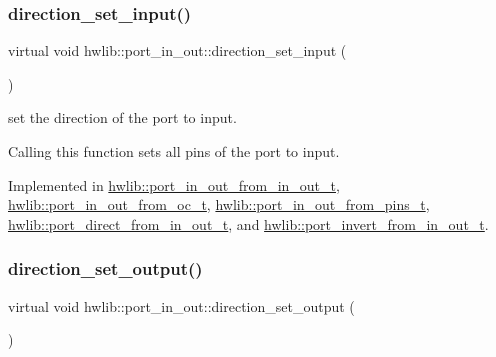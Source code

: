 \subsubsection{\texorpdfstring{direction\+\_\+set\+\_\+input()}{direction\_set\_input()}}
{\footnotesize\ttfamily virtual void hwlib\+::port\+\_\+in\+\_\+out\+::direction\+\_\+set\+\_\+input (\begin{DoxyParamCaption}{ }\end{DoxyParamCaption})\hspace{0.3cm}{\ttfamily [pure virtual]}}

set the direction of the port to input.

Calling this function sets all pins of the port to input. 

Implemented in \hyperlink{classhwlib_1_1port__in__out__from__in__out__t_a49e31b927bbf0c677cc9e436459aae44}{hwlib\+::port\+\_\+in\+\_\+out\+\_\+from\+\_\+in\+\_\+out\+\_\+t}, \hyperlink{classhwlib_1_1port__in__out__from__oc__t_a701fe36cf6d03151ede1382c0ee054c5}{hwlib\+::port\+\_\+in\+\_\+out\+\_\+from\+\_\+oc\+\_\+t}, \hyperlink{classhwlib_1_1port__in__out__from__pins__t_acdd41d7b0788c259ef2a7a62ea9476ea}{hwlib\+::port\+\_\+in\+\_\+out\+\_\+from\+\_\+pins\+\_\+t}, \hyperlink{classhwlib_1_1port__direct__from__in__out__t_ad4aa8a6a665220be275597d7b00a306c}{hwlib\+::port\+\_\+direct\+\_\+from\+\_\+in\+\_\+out\+\_\+t}, and \hyperlink{classhwlib_1_1port__invert__from__in__out__t_a5af46d9dbe68de372e99ffea6617cb34}{hwlib\+::port\+\_\+invert\+\_\+from\+\_\+in\+\_\+out\+\_\+t}.

\mbox{\label{classhwlib_1_1port__in__out_a515b4a6bbde4f2df5bb11cda41234fe4}} 
\subsubsection{\texorpdfstring{direction\+\_\+set\+\_\+output()}{direction\_set\_output()}}
{\footnotesize\ttfamily virtual void hwlib\+::port\+\_\+in\+\_\+out\+::direction\+\_\+set\+\_\+output (\begin{DoxyParamCaption}{ }\end{DoxyParamCaption})\hspace{0.3cm}{\ttfamily [pure virtual]}}

